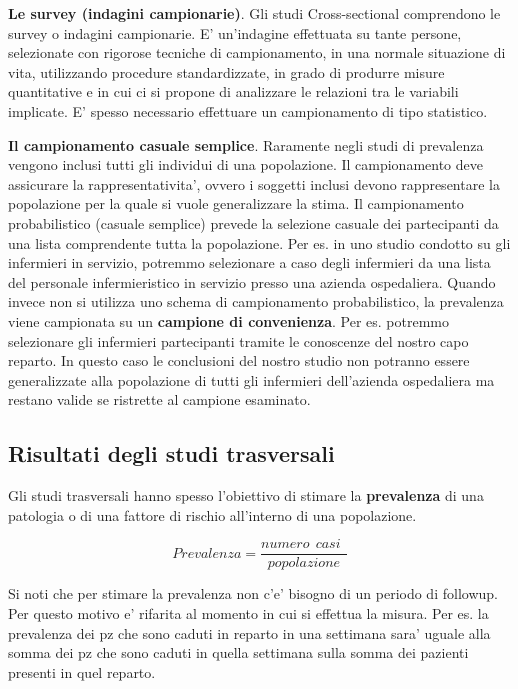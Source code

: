 \documentclass[]{book}
\begin{document}
\textbf{Le survey (indagini campionarie)}.
Gli studi Cross-sectional comprendono le survey o indagini campionarie. E' un'indagine effettuata su tante persone, selezionate con rigorose tecniche di campionamento, in una normale situazione di vita, utilizzando procedure standardizzate, in grado di produrre misure quantitative e in cui ci si propone di analizzare le relazioni tra le variabili implicate. E' spesso necessario effettuare un campionamento di tipo statistico.

\textbf{Il campionamento casuale semplice}.
Raramente negli studi di prevalenza vengono inclusi tutti gli individui di una popolazione. Il campionamento deve assicurare la rappresentativita', ovvero i soggetti inclusi devono rappresentare la popolazione per la quale si vuole generalizzare la stima. Il campionamento probabilistico (casuale semplice) prevede la selezione casuale dei partecipanti da una lista comprendente tutta la popolazione. Per es. in uno studio condotto su gli infermieri in servizio, potremmo selezionare a caso degli infermieri da una lista del personale infermieristico in servizio presso una azienda ospedaliera. Quando invece non si utilizza uno schema di campionamento probabilistico, la prevalenza viene campionata su un \textbf{campione di convenienza}. Per es. potremmo selezionare gli infermieri partecipanti tramite le conoscenze del nostro capo reparto. In questo caso le conclusioni del nostro studio non potranno essere generalizzate alla popolazione di tutti gli infermieri dell'azienda ospedaliera ma restano valide se ristrette al campione esaminato.

\hypertarget{risultati-degli-studi-trasversali}{%
\subsection{Risultati degli studi trasversali}\label{risultati-degli-studi-trasversali}}

Gli studi trasversali hanno spesso l'obiettivo di stimare la \textbf{prevalenza} di una patologia o di una fattore di rischio all'interno di una popolazione.

\[Prevalenza = \frac{numero\ \ casi\ \ }{popolazione}\]

Si noti che per stimare la prevalenza non c'e' bisogno di un periodo di followup. Per questo motivo e' rifarita al momento in cui si effettua la misura. Per es. la prevalenza dei pz che sono caduti in reparto in una settimana sara' uguale alla somma dei pz che sono caduti in quella settimana sulla somma dei pazienti presenti in quel reparto.
\end{document}
